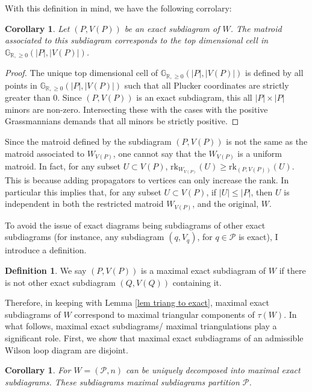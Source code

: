 \documentclass[11pt]{article}
\newcommand{\R}{\mathbb{R}}
\newcommand{\Gr}{\mathbb{G}_{\R, \geq 0}}
\newcommand{\rk}{\textrm{rk}}
\newcommand{\cP}{\mathcal{P}}
\newtheorem{cor}[thm]{Corollary}
\theoremstyle{remark}
\theoremstyle{definition}
\newtheorem{dfn}[thm]{Definition}
\begin{document}
With this definition in mind, we have the following corrolary:

\begin{cor}
Let $(P, V(P))$ be an exact subdiagram of $W$. The matroid associated to this subdiagram corresponds to the top dimensional cell in $\Gr(|P|, |V(P)|)$.
\end{cor}

\begin{proof}
The unique top dimensional cell of $\Gr(|P|, |V(P)|)$ is defined by all points in $\Gr(|P|, |V(P)|)$ such that all Plucker coordinates are strictly greater than $0$. Since $(P, V(P))$ is an exact subdiagram, this all $|P| \times |P|$ minors are non-zero. Intersecting these with the cases with the positive Grassmannians demands that all minors be strictly positive.
\end{proof}

Since the matroid defined by the subdiagram $(P , V(P))$ is not the same as the matroid associated to $W_{V(P)}$, one cannot say that the $W_{V(P)}$ is a uniform matroid. In fact, for any subset $U \subset V(P)$, $\rk_{W_{V(P)}}(U) \geq \rk_{(P , V(P))}(U)$. This is because adding propagators to vertices can only increase the rank. In particular this implies that, for any subset $U \subset V(P)$, if $|U| \leq |P|$, then $U$ is independent in both the restricted matroid $W_{V(P)}$, and the original, $W$.

To avoid the issue of exact diagrams being subdiagrams of other exact subdiagrams (for instance, any subdiagram $(q, V_q)$, for $q \in \cP$ is exact), I introduce a definition.

\begin{dfn}
We say $(P, V(P))$ is a maximal exact subdiagram of $W$ if there is not other exact subdiagram $(Q, V(Q))$ containing it.
\end{dfn}

Therefore, in keeping with Lemma \ref{lem triang to exact}, maximal exact subdiagrams of $W$ correspond to maximal triangular components of $\tau(W)$. In what follows, maximal exact subdiagrams/ maximal triangulations play a significant role. First, we show that maximal exact subdiagrams of an admissible Wilson loop diagram are disjoint.

\begin{cor} \label{uniqueproppartitioncor}
For $W = (\cP, n)$ can be uniquely decomposed into maximal exact subdiagrams. These subdiagrams maximal subdiagrams partition $\cP$.
\end{cor}
\end{document}
